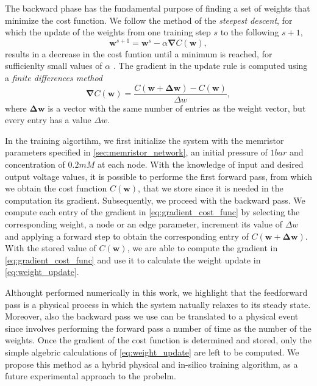 \documentclass[reprint,superscriptaddress,prb,showkeys]{revtex4-2}
\newcommand{\brac}[1]{\left(#1 \right)} %
\begin{document}
The backward phase has the fundamental purpose of finding a set of weights that minimize the cost function. We follow the method of the \textit{steepest descent}, for which the update of the weights from one training step $s$ to the following $s+1$,
\begin{equation}
\boldsymbol{w}^{s+1} = \boldsymbol{w}^{s} - \alpha \boldsymbol{\nabla}C\brac{\boldsymbol{w}},
\label{eq:weight_update}
\end{equation}
results in a decrease in the cost funtion until a minimum is reached, for sufficienlty small values of $\alpha$ \cite{steepest_descent_book}. The gradient in the update rule is computed using a \textit{finite differences method}
\begin{equation}
\boldsymbol{\nabla}C\brac{\boldsymbol{w}} = \frac{C\brac{\boldsymbol{w}+\boldsymbol{\Delta w}}-C\brac{\boldsymbol{w}}}{\Delta w},
\label{eq:gradient_cost_func}
\end{equation}
where $\boldsymbol{\Delta w}$ is a vector with the same number of entries as the weight vector, but every entry has a value $\Delta w$. 

In the training algortihm, we first initialize the system with the memristor parameters specified in \cref{sec:memristor_network}, an initial pressure of $1bar$ and concentration of $0.2mM$ at each node. With the knowledge of input and desired output voltage values, it is possible to performe the first forward pass, from which we obtain the cost function $C\brac{\boldsymbol{w}}$, that we store since it is needed in the computation its gradient. Subsequently, we proceed with the backward pass. We compute each entry of the gradient in \cref{eq:gradient_cost_func} by selecting the corresponding weight, a node or an edge parameter, increment its value of $\Delta w$ and applying a forward step to obtain the corresponding entry of $C\brac{\boldsymbol{w}+\boldsymbol{\Delta w}}$. With the stored value of $C\brac{\boldsymbol{w}}$, we are able to compute the gradient in \cref{eq:gradient_cost_func} and use it to calculate the weight update in \cref{eq:weight_update}. 

Althought performed numerically in this work, we highlight that the feedforward pass is a physical process in which the system natually relaxes to its steady state. Moreover, also the backward pass we use can be translated to a physical event since involves performing the forward pass a number of time as the number of the weights. Once the gradient of the cost function is determined and stored, only the simple algebric calculations of \cref{eq:weight_update} are left to be computed. We propose this method as a hybrid physical and in-silico training algorithm, as a future experimental approach to the probelm.
\end{document}
